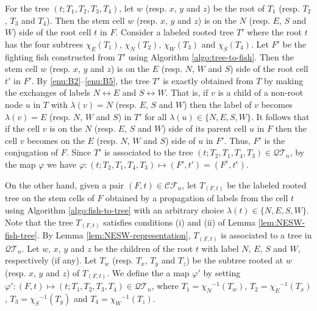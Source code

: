 \documentclass[a4paper,11pt,reqno]{amsart}
\theoremstyle{definition}
\numberwithin{equation}{section}
\newcommand{\cc}{{\mathrm{c}}}
\newcommand{\CF}{{\mathcal{CF}}}
\newcommand{\QT}{{\mathcal{QT}}}
\begin{document}
For the tree $(t;T_1,T_2,T_3,T_4)$, let $w$ (resp. $x$, $y$ and $z$) be the root of $T_1$ (resp. $T_2$, $T_3$ and $T_4$). Then the stem cell $w$ (resp. $x$, $y$ and $z$) is on the $N$ (resp. $E$, $S$ and $W$) side of the root cell $t$ in $F$. Consider a labeled rooted tree $T'$ where the root $t$ has the four subtrees  ${\chi_E}(T_1)$, ${\chi_N}(T_2)$, ${\chi_W}(T_3)$ and ${\chi_S}(T_4)$. Let $F'$ be the fighting fish constructed from $T'$ using Algorithm \ref{algo:tree-to-fish}. Then the stem cell $w$ (resp. $x$, $y$ and $z$) is on the $E$ (resp. $N$, $W$ and $S$) side of the root cell $t'$ in $F'$.
By \ref{enu:B2}--\ref{enu:B5}, the tree $T'$ is exactly obtained from $T$ by making the exchanges of labels $N\leftrightarrow E$ and $S\leftrightarrow W$.
That is, if $v$ is a child of a non-root node $u$ in $T$ with $\lambda(v)=N$ (resp. $E$, $S$ and $W$) then the label of $v$ becomes $\lambda(v)=E$ (resp. $N$, $W$ and $S$) in $T'$ for all $\lambda(u)\in\{N,E,S,W\}$. It follows that if the cell $v$ is on the $N$ (resp. $E$, $S$ and $W$) side of its parent cell $u$ in $F$ then the cell $v$ becomes on the $E$ (resp. $N$, $W$ and $S$) side of $u$ in $F'$. Thus, $F'$ is the conjugation of $F$. Since $T'$ is associated to the tree $(t;T_2,T_1,T_4,T_3)\in\QT_n$, by the map $\varphi$ we have $\varphi:(t;T_2,T_1,T_4,T_3)\mapsto (F',t')=(F^{\cc},t^{\cc})$.


On the other hand, given a pair $(F,t)\in\CF_n$, let $T_{(F,t)}$ be the labeled rooted tree on the stem cells of $F$ obtained by a propagation of labels from the cell $t$ using Algorithm \ref{algo:fish-to-tree} with an arbitrary choice $\lambda(t)\in\{N,E,S,W\}$. Note that the tree $T_{(F,t)}$ satisfies conditions (i) and (ii) of Lemma \ref{lem:NESW-fish-tree}. By Lemma \ref{lem:NESW-representation},  $T_{(F,t)}$ is associated to a tree in $\QT_n$. Let $w$, $x$, $y$ and $z$ be the children of the root $t$ with label $N$, $E$, $S$ and $W$, respectively (if any). Let $T_w$ (resp. $T_x$, $T_y$ and $T_z$) be the subtree rooted at $w$ (resp. $x$, $y$ and $z$) of $T_{(F,t)}$. We define the a map $\varphi'$ by setting $\varphi':(F,t)\mapsto (t;T_1,T_2,T_3,T_4)\in\QT_n$, where $T_1={\chi_N}^{-1}(T_w)$, $T_2={\chi_E}^{-1}(T_x)$, $T_3={\chi_S}^{-1}(T_y)$ and $T_4={\chi_W}^{-1}(T_z)$. 
\end{document}
